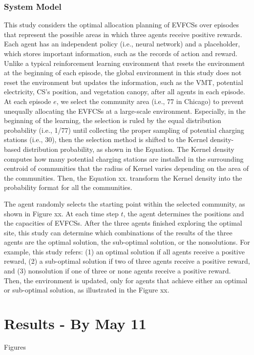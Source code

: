 \documentclass[preprint,12pt]{elsarticle}
\begin{document}
\subsubsection{System Model}
This study considers the optimal allocation planning of EVFCSs over episodes that represent the possible areas in which three agents receive positive rewards. Each agent has an independent policy (i.e., neural network) and a placeholder, which stores important information, such as the records of action and reward. Unlike a typical reinforcement learning environment that resets the environment at the beginning of each episode, the global environment in this study does not reset the environment but updates the information, such as the VMT, potential electricity, CS's position, and vegetation canopy, after all agents in each episode. At each episode $e$, we select the community area (i.e., 77 in Chicago) to prevent unequally allocating the EVFCSs at a large-scale environment. Especially, in the beginning of the learning, the selection is ruled by the equal distribution probability (i.e., 1/77) until collecting the proper sampling of potential charging stations (i.e., 30), then the selection method is shifted to the Kernel density-based distribution probability, as shown in the Equation. The Kernel density computes how many potential charging stations are installed in the surrounding centroid of communities that the radius of Kernel varies depending on the area of the communities. Then, the Equation xx. transform the Kernel density into the probability format for all the communities. 

The agent randomly selects the starting point within the selected community, as shown in Figure xx. At each time step $t$, the agent determines the positions and the capacities of EVFCSs. After the three agents finished exploring the optimal site, this study can determine which combinations of the results of the three agents are the optimal solution, the sub-optimal solution, or the nonsolutions. For example, this study refers: (1) an optimal solution if all agents receive a positive reward, (2) a sub-optimal solution if two of three agents receive a positive reward, and (3) nonsolution if one of three or none agents receive a positive reward. Then, the environment is updated, only for agents that achieve either an optimal or sub-optimal solution, as illustrated in the Figure xx. 

\section{Results - By May 11}
Figures
\end{document}
